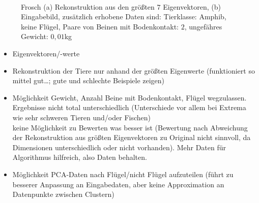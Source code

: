 \begin{figure}
  \centering
  \\
  
  \caption{Frosch (a) Rekonstruktion aus den größten $7$ Eigenvektoren, (b) Eingabebild, zusätzlich erhobene Daten sind:
  Tierklasse: Amphib, keine Flügel, Paare von Beinen mit Bodenkontakt: $2$, ungefähres Gewicht: $0,01$kg}
  \label{frosch}
 \end{figure}


 \begin{itemize}
  \item Eigenvektoren/-werte
  \item Rekonstruktion der Tiere nur anhand der größten Eigenwerte (funktioniert so mittel gut\dots; gute und schlechte Beispiele zeigen)
  \item Möglichkeit Gewicht, Anzahl Beine mit Bodenkontakt, Flügel wegzulassen. Ergebnisse nicht total unterschiedlich (Unterschiede vor allem bei Extrema wie sehr schweren Tieren und/oder Fischen)\\
  keine Möglichkeit zu Bewerten was besser ist (Bewertung nach Abweichung der Rekonstruktion aus größten Eigenvektoren zu Original nicht sinnvoll, da Dimensionen unterschiedlich oder nicht vorhanden). Mehr Daten für Algorithmus hilfreich, also Daten behalten.
  \item Möglichkeit PCA-Daten nach Flügel/nicht Flügel aufzuteilen (führt zu besserer Anpassung an Eingabedaten, aber keine Approximation an Datenpunkte zwischen Clustern) 
 \end{itemize}
 

